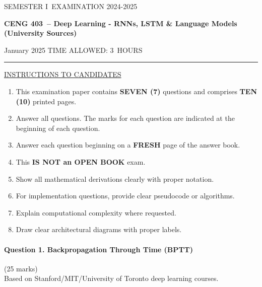 \documentclass[12pt]{article}
\newcommand{\masunitnumber}{CENG 403}
\newcommand{\examdate}{January 2025}
\newcommand{\academicyear}{2024-2025}
\newcommand{\semester}{I}
\newcommand{\coursename}{Deep Learning - RNNs, LSTM \& Language Models (University Sources)}
\newcommand{\numberofhours}{3}
\begin{document}
\setlength{\headsep}{5truemm}
\setlength{\headheight}{14.5truemm}
\setlength{\voffset}{-0.45truein}
\renewcommand{\headrulewidth}{0.0pt}
\begin{center}
SEMESTER \semester\ EXAMINATION \academicyear
\end{center}
\begin{center}
{\bf \masunitnumber\ -- \coursename}
\end{center}
\vspace{20truemm}
\noindent \examdate\hspace{45truemm} TIME ALLOWED: \numberofhours\ HOURS
\vspace{19truemm}
\hrule
\vspace{19truemm}
\noindent\underline{INSTRUCTIONS TO CANDIDATES}
\vspace{8truemm}
\begin{enumerate}
\item This examination paper contains {\bf SEVEN (7)} questions and comprises 
{\bf TEN (10)} printed pages.
\item Answer all questions. 
The marks for each question are indicated at the beginning of each question.
\item Answer each question beginning on a {\bf FRESH} page of the answer book.
\item This {\bf IS NOT an OPEN BOOK} exam.
\item Show all mathematical derivations clearly with proper notation.
\item For implementation questions, provide clear pseudocode or algorithms.
\item Explain computational complexity where requested.
\item Draw clear architectural diagrams with proper labels.
\end{enumerate}
\newpage
\lhead{}
\rhead{\masunitnumber}
\chead{}
\lfoot{}
\cfoot{\thepage}
\rfoot{}
\setlength{\footskip}{45pt}

\paragraph{Question 1. Backpropagation Through Time (BPTT)}\hfill (25 marks)\\
Based on Stanford/MIT/University of Toronto deep learning courses.
\end{document}

